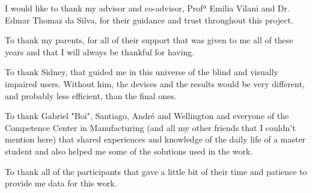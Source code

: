 
I would like to thank my advisor and co-advisor, Profª Emilia Vilani and Dr. Edmar Thomaz da Silva, for their guidance and trust throughout this project.

To thank my parents, for all of their support that was given to me all of these years and that I will always be thankful for having.

To thank Sidney, that guided me in this universe of the blind and visually impaired users. Without him, the devices and the results would be very different, and probably less efficient, than the final ones.

To thank Gabriel "Boi", Santiago, André and Wellington and everyone of the Competence Center in Manufacturing (and all my other friends that I couldn't mention here) that shared experiences and knowledge of the daily life of a master student and also helped me some of the solutions used in the work.

To thank all of the participants that gave a little bit of their time and patience to provide me data for this work.
